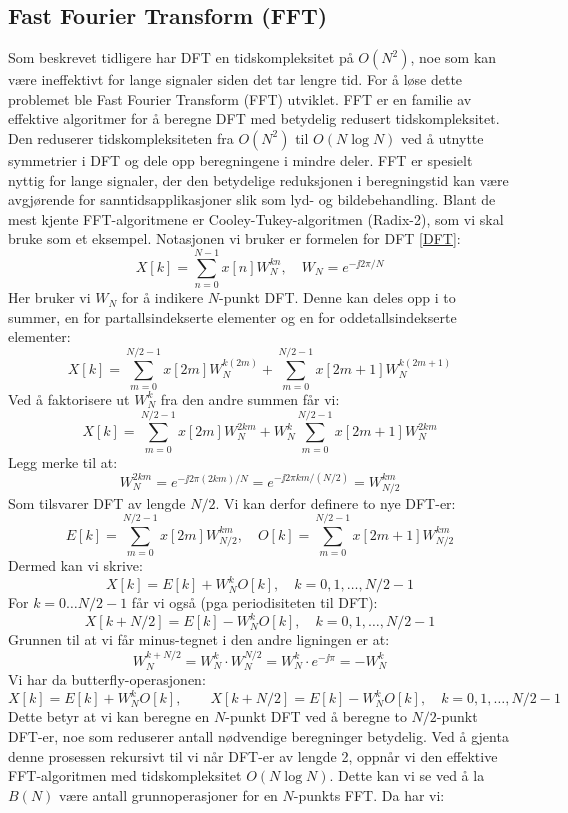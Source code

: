\subsection{Fast Fourier Transform (FFT)}
Som beskrevet tidligere har DFT en tidskompleksitet på $O(N^2)$, noe som kan være ineffektivt for lange signaler siden det tar lengre tid. For å løse dette problemet ble Fast Fourier Transform (FFT) utviklet. FFT er en familie av effektive algoritmer for å beregne DFT med betydelig redusert tidskompleksitet. Den reduserer tidskompleksiteten fra $O(N^2)$ til $O(N \log N)$ ved å utnytte symmetrier i DFT og dele opp beregningene i mindre deler. FFT er spesielt nyttig for lange signaler, der den betydelige reduksjonen i beregningstid kan være avgjørende for sanntidsapplikasjoner slik som lyd- og bildebehandling. Blant de mest kjente FFT-algoritmene er Cooley-Tukey-algoritmen (Radix-2), som vi skal bruke som et eksempel. Notasjonen vi bruker er formelen for DFT \eqref{DFT}:
\[
    X[k] = \sum_{n=0}^{N-1} x[n] W_{N}^{kn}, \quad W_{N} = e^{-\jj 2 \pi / N}
\]
Her bruker vi $W_{N}$ for å indikere $N$-punkt DFT. Denne kan deles opp i to summer, en for partallsindekserte elementer og en for oddetallsindekserte elementer:
\[
    X[k] = \sum_{m=0}^{N/2-1} x[2m] W_{N}^{k(2m)} + \sum_{m=0}^{N/2-1} x[2m+1] W_{N}^{k(2m+1)}
\]
Ved å faktorisere ut $W_{N}^{k}$ fra den andre summen får vi: 
\[
    X[k] = \sum_{m=0}^{N/2-1} x[2m] W_{N}^{2km} + W_{N}^{k} \sum_{m=0}^{N/2-1} x[2m+1] W_{N}^{2km}
\]
Legg merke til at:
\[
    W_{N}^{2km} = e^{-\jj 2 \pi (2km) / N} = e^{-\jj 2 \pi km / (N/2)} = W_{N/2}^{km}
\]
Som tilsvarer DFT av lengde $N/2$. Vi kan derfor definere to nye DFT-er:
\[
    E[k] = \sum_{m=0}^{N/2-1} x[2m] W_{N/2}^{km}, \quad O[k] = \sum_{m=0}^{N/2-1} x[2m+1] W_{N/2}^{km}
\]
Dermed kan vi skrive:
\[
    X[k] = E[k] + W_{N}^{k} O[k], \quad k = 0, 1, \ldots, N/2 - 1
\]
For $k = 0 \ldots N/2 - 1$ får vi også (pga periodisiteten til DFT):
\[
    X[k + N/2] = E[k] - W_{N}^{k} O[k], \quad k = 0, 1, \ldots, N/2 - 1
\]
Grunnen til at vi får minus-tegnet i den andre ligningen er at:
\[
    W_N^{k + N/2} = W_N^k \cdot W_N^{N/2} = W_N^k \cdot e^{-\jj \pi} = -W_N^k
\]
Vi har da butterfly-operasjonen:
\[
    X[k] = E[k] + W_{N}^{k} O[k], \qquad X[k + N/2] = E[k] - W_{N}^{k} O[k], \quad k = 0, 1, \ldots, N/2 - 1
\]
\clearpage
\noindent
Dette betyr at vi kan beregne en $N$-punkt DFT ved å beregne to $N/2$-punkt DFT-er, noe som reduserer antall nødvendige beregninger betydelig. Ved å gjenta denne prosessen rekursivt til vi når DFT-er av lengde 2, oppnår vi den effektive FFT-algoritmen med tidskompleksitet $O(N \log N)$. Dette kan vi se ved å la $B(N)$ være antall grunnoperasjoner for en $N$-punkts FFT. Da har vi:
